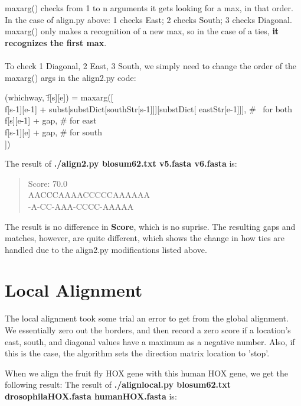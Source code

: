\documentclass[12pt]{article}
\begin{document}
	maxarg() checks from 1 to n arguments it gets looking for a max, in that order. In the case of align.py above: 1 checks East; 2 checks South; 3 checks Diagonal. maxarg() only makes a recognition of a new max, so in the case of a ties, \textbf{it recognizes the first max}.
	\\ \\
	To check 1 Diagonal, 2 East, 3 South, we simply need to change the order of the maxarg() args in the align2.py code:
	\begin{tabbing}
		(whichway, \= f[s][e]) = maxarg([	\\
		\>              f[s-1][e-1] + subst[substDict[southStr[s-1]]][substDict[ eastStr[e-1]]],  \# \
for both  \\
		\>	          f[s][e-1] + gap,               \# for east  \\                                  
		\>         	 f[s-1][e] + gap,               \# for south   \\                                                                                                                                
		]) \\
	\end{tabbing}

	The result of \textbf{./align2.py blosum62.txt v5.fasta v6.fasta} is:
	\begin{verse}
		Score: 70.0 \\
		AACCCAAAACCCCCAAAAAA \\
		-A-CC-AAA-CCCC-AAAAA
	\end{verse}

	The result is no difference in \textbf{Score}, which is no suprise. The resulting gaps and matches, however, are quite different, which shows the change in how ties are handled due to the align2.py modifications listed above.


	\section{Local Alignment}
	The local alignment took some trial an error to get from the global alignment. We essentially zero out the borders, and then record a zero score if a location's east, south, and diagonal values have a maximum as a negative number. Also, if this is the case, the algorithm sets the direction matrix location to 'stop'.

	\pagebreak	

	When we align the fruit fly HOX gene with this human HOX gene, we get the following result:
	The result of \textbf{./alignlocal.py blosum62.txt drosophilaHOX.fasta humanHOX.fasta} is:
	
\end{document}
